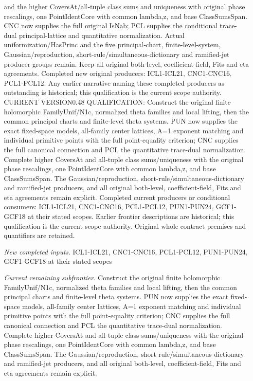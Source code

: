\documentclass[11pt,a4paper]{article}
\numberwithin{equation}{section}
\theoremstyle{remark}\newtheorem{remark}[theorem]{Remark}
\begin{document}
and the higher CoversAt/all-tuple class sums and uniqueness with original phase rescalings, one PointIdentCore with common lambda,z, and base ClassSumsSpan. CNC now supplies the full original IsNab; PCL supplies the conditional trace-dual principal-lattice and quantitative normalization. Actual uniformization/HasPrinc and the five principal-chart, finite-level-system, Gaussian/reproduction, short-rule/simultaneous-dictionary and ramified-jet producer groups remain. Keep all original both-level, coefficient-field, Fits and eta agreements. Completed new original producers: ICL1-ICL21, CNC1-CNC16, PCL1-PCL12. Any earlier narrative naming these completed producers as outstanding is historical; this qualification is the current scope authority. CURRENT VERSION0.48 QUALIFICATION: Construct the original finite holomorphic FamilyUnif/N1c, normalized theta families and local lifting, then the common principal charts and finite-level theta systems. PUN now supplies the exact fixed-space models, all-family center lattices, A=1 exponent matching and individual primitive points with the full point-equality criterion; CNC supplies the full canonical connection and PCL the quantitative trace-dual normalization. Complete higher CoversAt and all-tuple class sums/uniqueness with the original phase rescalings, one PointIdentCore with common lambda,z, and base ClassSumsSpan. The Gaussian/reproduction, short-rule/simultaneous-dictionary and ramified-jet producers, and all original both-level, coefficient-field, Fits and eta agreements remain explicit. Completed current producers or conditional consumers: ICL1-ICL21, CNC1-CNC16, PCL1-PCL12, PUN1-PUN24, GCF1-GCF18 at their stated scopes. Earlier frontier descriptions are historical; this qualification is the current scope authority. Original whole-contract premises and quantifiers are retained.

\emph{New completed inputs.} ICL1-ICL21, CNC1-CNC16, PCL1-PCL12, PUN1-PUN24, GCF1-GCF18 at their stated scopes

\emph{Current remaining subfrontier.} Construct the original finite holomorphic FamilyUnif/N1c, normalized theta families and local lifting, then the common principal charts and finite-level theta systems. PUN now supplies the exact fixed-space models, all-family center lattices, A=1 exponent matching and individual primitive points with the full point-equality criterion; CNC supplies the full canonical connection and PCL the quantitative trace-dual normalization. Complete higher CoversAt and all-tuple class sums/uniqueness with the original phase rescalings, one PointIdentCore with common lambda,z, and base ClassSumsSpan. The Gaussian/reproduction, short-rule/simultaneous-dictionary and ramified-jet producers, and all original both-level, coefficient-field, Fits and eta agreements remain explicit.
\end{document}
